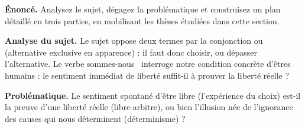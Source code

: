 \documentclass[11pt]{article}
\begin{document}
\begin{exoresolu}
\textbf{Énoncé.} Analysez le sujet, dégagez la problématique et construisez un plan détaillé en trois parties, en mobilisant les thèses étudiées dans cette section.

\tcblower
\textbf{Analyse du sujet.} Le sujet oppose deux termes par la conjonction \guillemotleft ou \guillemotright (alternative exclusive en apparence) : il faut donc choisir, ou dépasser l'alternative. Le verbe \guillemotleft sommes-nous \guillemotright\ interroge notre condition concrète d'êtres humains : le sentiment immédiat de liberté suffit-il à prouver la liberté réelle ?

\textbf{Problématique.} Le sentiment spontané d'être libre (l'expérience du choix) est-il la preuve d'une liberté réelle (libre-arbitre), ou bien l'illusion née de l'ignorance des causes qui nous déterminent (déterminisme) ?


\end{exoresolu}
\end{document}
